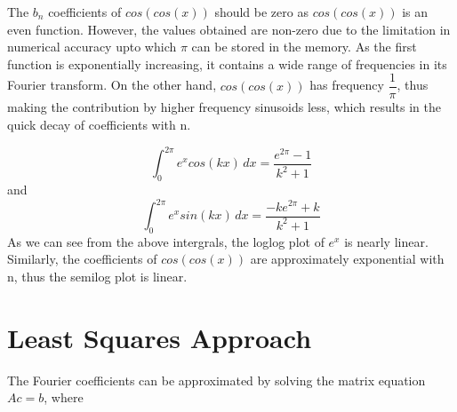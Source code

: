 \documentclass[11pt, a4paper]{article}
\begin{document}
 The $b_n$ coefficients of $cos(cos(x))$ should be zero as $cos(cos(x))$ is an even function. However, the values obtained are non-zero due to the limitation in numerical accuracy upto which $\pi$ can be stored in the memory.
 As the first function is exponentially increasing, it contains a wide range of frequencies in its Fourier transform. On the other hand, $cos(cos(x))$ has frequency $\dfrac{1}{\pi}$, thus making the contribution by higher frequency sinusoids less, which results in the quick decay of coefficients with n.
 
 \[ \int_{0}^{2\pi} e^x cos(kx) \,dx  = \dfrac{e^{2\pi} - 1}{k^2 + 1}\] and
  \[ \int_{0}^{2\pi} e^x sin(kx) \,dx  = \dfrac{-ke^{2\pi} + k}{k^2 + 1}\]
 As we can see from the above intergrals, the loglog plot of $e^x$ is nearly linear.
Similarly, the coefficients of $cos(cos(x))$ are approximately exponential with n, thus the semilog plot is linear.

 
 
 \section{Least Squares Approach}
 The Fourier coefficients can be approximated by solving the matrix equation $Ac = b$, where 
 
\end{document}
